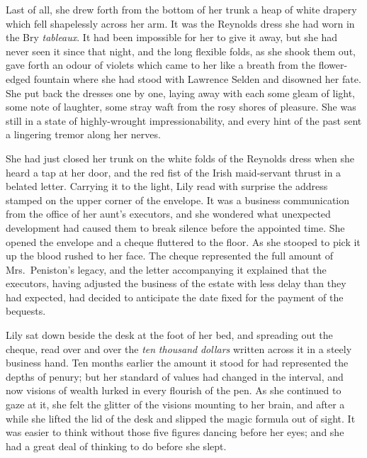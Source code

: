 \documentclass[12pt,a4paper]{book}
\begin{document}
Last of all, she drew forth from the bottom of her trunk a heap
of white drapery which fell shapelessly across her arm. It was
the Reynolds dress she had worn in the Bry \textit{tableaux}. It had been
impossible for her to give it away, but she had never seen it
since that night, and the long flexible folds, as she
shook them out, gave forth an odour of violets which came to her
like a breath from the flower-edged fountain where she had stood
with Lawrence Selden and disowned her fate. She put back the
dresses one by one, laying away with each some gleam of light,
some note of laughter, some stray waft from the rosy shores of
pleasure. She was still in a state of highly-wrought
impressionability, and every hint of the past sent a lingering
tremor along her nerves.





She had just closed her trunk on the white folds of the Reynolds
dress when she heard a tap at her door, and the red fist of the
Irish maid-servant thrust in a belated letter. Carrying it to the
light, Lily read with surprise the address stamped on the upper
corner of the envelope. It was a business communication from the
office of her aunt's executors, and she wondered what unexpected
development had caused them to break silence before the appointed
time. She opened the envelope and a cheque fluttered to the
floor. As she stooped to pick it up the blood rushed to her face. 
The cheque represented the full amount of Mrs.\ Peniston's legacy,
and the letter accompanying it explained that the executors,
having adjusted the business of the estate with less delay than
they had expected, had decided to anticipate the date fixed for
the payment of the bequests.





Lily sat down beside the desk at the foot of her bed, and
spreading out the cheque, read over and over the \textit{ten} \textit{thousand}
\textit{dollars} written across it in a steely business hand. Ten months
earlier the amount it stood for had represented the depths of
penury; but her standard of values had changed in the interval,
and now visions of wealth lurked in every flourish of the pen. As
she continued to gaze at it, she felt the glitter of the visions
mounting to her brain, and after a while she lifted the lid of
the desk and slipped the magic formula out of sight. It was
easier to think without those five figures dancing before her
eyes; and she had a great deal of thinking to do before she
slept.
\end{document}
